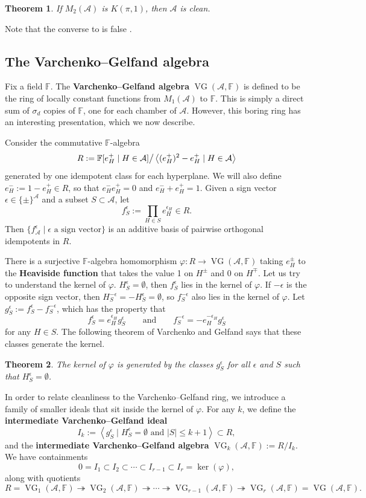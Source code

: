 \documentclass[11pt]{article}
\newtheorem{theorem}{Theorem}[section]
\theoremstyle{definition}
\newcommand{\eps}{\epsilon}
\newcommand{\F}{\mathbb{F}}
\newcommand{\<}{\left<}
\renewcommand{\>}{\right>}
\newcommand{\cA}{\mathcal{A}}
\newcommand{\cS}{S}
\renewcommand{\and}{\qquad\text{and}\qquad}
\newcommand{\VG}{\operatorname{VG}}
\newcommand{\abs}[1]{\left|#1\right|}               %
\newcommand{\angl}[1]{\left<#1\right>}              %
\begin{document}
\begin{theorem}\label{thm:yoshinaga}
If $M_2(\cA)$ is $K(\pi,1)$, then $\cA$ is clean.
\end{theorem}

Note that the converse to  is false \cite[Example 5.5]{yoshinaga-spheres}.

\subsection{The Varchenko--Gelfand algebra}
Fix a field $\F$.  The {\bf Varchenko--Gelfand algebra} $\VG(\cA,\F)$ is defined to be the ring of locally constant functions from $M_1(\cA)$ to $\F$.
This is simply a direct sum of $\sigma_d$ copies of $\F$, one for each chamber of $\cA$.
However, this boring ring has an interesting presentation, which we now describe.

Consider the commutative $\F$-algebra
\[
R := \F[e_H^+\mid H\in\cA]\big{/}\angl{(e_H^+)^2 - e_H^+\mid H\in\cA}
\]
generated by one idempotent class for each hyperplane.
We will also define $e_H^- := 1 - e_H^+\in R$, so that $e_H^- e_H^+ = 0$ and $e_H^- + e_H^+ = 1$.  
Given a sign vector $\eps\in\{\pm\}^\cA$ and a subset $\cS\subset\cA$, let
\[
f_\cS^\eps := \prod_{H\in\cS} e_H^{\eps_H}\in R.
\]
Then $\{f_\cA^\eps\mid \text{$\eps$ a sign vector}\}$
is an additive basis of pairwise orthogonal idempotents in $R$.

There is a surjective $\F$-algebra homomorphism
$\varphi:R\to\VG(\cA,\F)$ taking $e_H^{\pm}$ to the {\bf Heaviside function} that takes the value 1 on $H^{\pm}$ and 0 on $H^{\mp}$.
Let us try to understand the kernel of $\varphi$.
$H_\cS^\eps = \emptyset$, then $f_\cS^{\eps}$ lies in the kernel of $\varphi$.
If $-\eps$ is the opposite sign vector, then $H_\cS^{-\eps} = - H_\cS^\eps = \emptyset$, so $f_\cS^{-\eps}$
also lies in the kernel of $\varphi$.
Let $g_{\cS}^\eps := f_{\cS}^\eps - f_{\cS}^{-\eps}$,
which has the property that
\[
f_{\cS}^\eps = e_H^{\eps_H} g_{\cS}^\eps \and f_{\cS}^{-\eps} = -e_H^{-\eps_H} g_{\cS}^\eps
\]
for any $H\in\cS$.
The following theorem of Varchenko and Gelfand \cite[Theorem 6]{VarchenkoGelfand} says that these classes generate the kernel.

\begin{theorem}\label{thm:VG}
The kernel of $\varphi$ is generated by the classes $g_\cS^{\eps}$ for all $\eps$ and $\cS$ such that $H_\cS^\eps = \emptyset$.
\end{theorem}

In order to relate cleanliness to the Varchenko--Gelfand ring, we introduce a family of smaller ideals that sit inside the kernel of $\varphi$.
For any $k$, we define the {\bf {} intermediate Varchenko--Gelfand ideal}
\[
I_k := \angl{g_{\cS}^\eps \mid \text{$H_\cS^\eps = \emptyset$ and $\abs{\cS}\leq k+1$}}\subset R,
\]
and the {\bf {} intermediate Varchenko--Gelfand algebra} $\VG_k(\cA,\F) := R/I_k$. 
We have containments
\[
0 = I_1 \subset I_2 \subset\cdots\subset I_{r-1}\subset I_r = \ker(\varphi),
\]
along with quotients
\[
R = \VG_1(\cA,\F)\twoheadrightarrow \VG_2(\cA,\F)\twoheadrightarrow\cdots\twoheadrightarrow\VG_{r-1}(\cA,\F)\twoheadrightarrow\VG_{r}(\cA,\F)=\VG(\cA,\F).
\]
\end{document}
